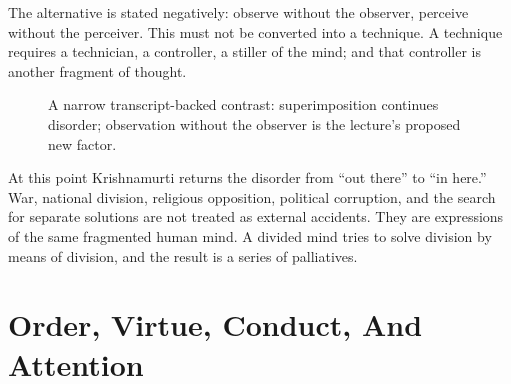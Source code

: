 The alternative is stated negatively: observe without the observer, perceive without the perceiver. This must not be converted into a technique. A technique requires a technician, a controller, a stiller of the mind; and that controller is another fragment of thought.

\begin{figure}
\centering
{}

A narrow transcript-backed contrast: superimposition continues disorder; observation without the observer is the lecture's proposed new factor.
\end{figure}

At this point Krishnamurti returns the disorder from ``out there'' to ``in here.'' War, national division, religious opposition, political corruption, and the search for separate solutions are not treated as external accidents. They are expressions of the same fragmented human mind. A divided mind tries to solve division by means of division, and the result is a series of palliatives.

\section{Order, Virtue, Conduct, And Attention}

